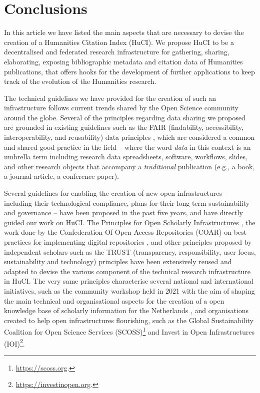 \section{Conclusions} \label{sec:conclusions}

In this article we have listed the main aspects that are necessary to devise the creation of a Humanities Citation Index (HuCI). We propose HuCI to be a decentralised and federated research infrastructure for gathering, sharing, elaborating, exposing bibliographic metadata and citation data of Humanities publications, that offers hooks for the development of further applications to keep track of the evolution of the Humanities research. 

The technical guidelines we have provided for the creation of such an infrastructure follows current trends shared by the Open Science community around the globe. Several of the principles regarding data sharing we proposed are grounded in existing guidelines such as the FAIR (findability, accessibility, interoperability, and reusability) data principles \cite{wilkinson_fair_2016}, which are considered a common and shared good practice in the field -- where the word \emph{data} in this context is an umbrella term including research data spreadsheets, software, workflows, slides, and other research objects that accompany a \emph{traditional} publication (e.g., a book, a journal article, a conference paper).

Several guidelines for enabling the creation of new open infrastructures -- including their technological compliance, plans for their long-term sustainability and governance -- have been proposed in the past five years, and have directly guided our work on HuCI. The Principles for Open Scholarly Infrastructures \cite{bilder_principles_2020}, the work done by the Confederation Of Open Access Repositories (COAR) on best practices for implementing digital repositories \cite{coar_wg_next_generation_repositories_behaviours_2017, confederation_of_open_access_repositories_coar_2020}, and other principles proposed by independent scholars such as the TRUST (transparency, responsibility, user focus, sustainability and technology) principles \cite{lin_trust_2020} have been extensively reused and adapted to devise the various component of the technical research infrastructure in HuCI. The very same principles characterise several national and international initiatives, such as the community workshop held in 2021 with the aim of shaping the main technical and organisational aspects for the creation of a open knowledge base of scholarly information for the Netherlands \cite{neylon_open_2021}, and organisations created to help open infrastructures flourishing, such as the Global Sustainability Coalition for Open Science Services (SCOSS)\footnote{\url{https://scoss.org}.} and Invest in Open Infrastructures (IOI)\footnote{\url{https://investinopen.org}.}.

